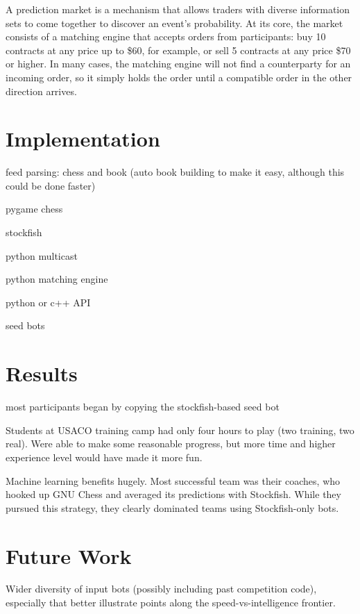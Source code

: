 \documentclass{article}
\begin{document}
A prediction market is a mechanism that allows traders with diverse information sets to come
together to discover an event's probability. At its core, the market consists of a matching engine
that accepts orders from participants: buy 10 contracts at any price up to \$60, for example, or
sell 5 contracts at any price \$70 or higher. In many cases, the matching engine will not find a
counterparty for an incoming order, so it simply holds the order until a compatible order in the
other direction arrives. 

\section{Implementation}

feed parsing: chess and book (auto book building to make it easy, although this could be done faster)

pygame chess

stockfish

python multicast

python matching engine

python or c++ API

seed bots

\section{Results}

most participants began by copying the stockfish-based seed bot

Students at USACO training camp had only four hours to play (two training, two real). Were able to make some reasonable progress, but more time and higher experience level would have made it more fun. 

Machine learning benefits hugely. Most successful team was their coaches, who hooked up GNU Chess
and averaged its predictions with Stockfish. While they pursued this strategy, they clearly
dominated teams using Stockfish-only bots.

\section{Future Work}

Wider diversity of input bots (possibly including past competition code), especially that better illustrate points along the speed-vs-intelligence frontier.
\end{document}
